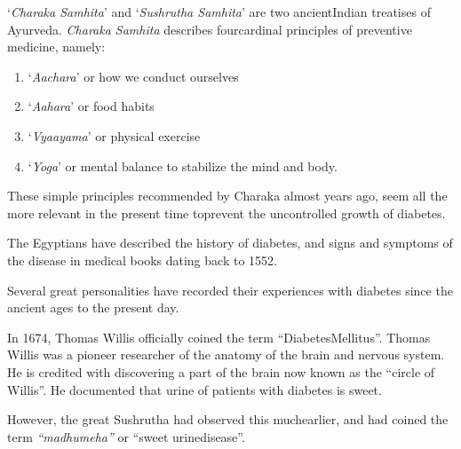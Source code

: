 ‘\textit{Charaka Samhita}’ and ‘\textit{Sushrutha Samhita}’ are two ancient\break Indian treatises of Ayurveda. \textit{Charaka Samhita} describes four\break cardinal principles of preventive medicine, namely:

\vspace{-\topsep}
\begin{enumerate}
\itemsep=0pt
\item ‘\textit{Aachara}’ or how we conduct ourselves
\item ‘\textit{Aahara}’ or food habits
\item ‘\textit{Vyaayama}’ or physical exercise
\item ‘\textit{Yoga}’ or mental balance to stabilize the mind and body.
\end{enumerate}
\vspace{-\topsep}

These simple principles recommended by Charaka almost years ago, seem all the more relevant in the present time to\break prevent the uncontrolled growth of diabetes.

The Egyptians have described the history of diabetes, and signs and symptoms of the disease in medical books dating back to 1552.

Several great personalities have recorded their experiences with diabetes since the ancient ages to the present day.

In 1674, Thomas Willis officially coined the term “Diabetes\break Mellitus”. Thomas Willis was a pioneer researcher of the ana\-tomy of the brain and nervous system. He is credited with disco\-vering a part of the brain now known as the “circle of Willis”. He documented that urine of patients with diabetes is sweet.

However, the great Sushrutha had observed this much\break earlier, and had coined the term \textit{“madhumeha”} or “sweet urine\break disease”.

